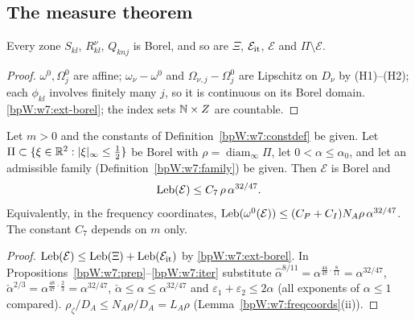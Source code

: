 \subsection{The measure theorem}\label{bpW:w7:main-sec}

\begin{lemma}[Measurability]\label{bpW:w7:measurable}
Every zone $S_{kl}$, $R^\nu_{kl}$, $Q_{knj}$ is Borel, and so are $\Xi$, $\mathcal E_{\rm it}$, $\mathcal E$ and
$\Pi\setminus\mathcal E$.
\end{lemma}
\begin{proof}
\label{stepW:w7:meas-cont}
$\omega^0,\Omega^0_j$ are affine; $\omega_\nu-\omega^0$ and $\Omega_{\nu,j}-\Omega^0_j$ are Lipschitz on $D_\nu$ by
(H1)--(H2); each $\phi_{kl}$ involves finitely many $j$, so it is continuous on its Borel domain.
\label{stepW:w7:meas-union}
\ref{bpW:w7:ext-borel}; the index sets $\mathbb{N}\times Z$ are countable.
\end{proof}

\begin{theorem}\label{bpW:w7:measure}
Let $m>0$ and the constants of Definition~\ref{bpW:w7:constdef} be given. Let $\Pi\subset\{\xi\in\mathbb{R}^2:
\lvert \xi\rvert_\infty\le\frac12\}$ be Borel with $\rho=\operatorname{diam}_\infty\Pi$, let $0<\alpha\le\alpha_0$, and let an
admissible family (Definition~\ref{bpW:w7:family}) be given. Then $\mathcal E$ is Borel and
\[\operatorname{Leb}(\mathcal E)\le C_7\,\rho\,\alpha^{32/47}.\]
Equivalently, in the frequency coordinates, $\operatorname{Leb}(\omega^0(\mathcal E))\le(C_P+C_I)N_A\rho\,\alpha^{32/47}$. The
constant $C_7$ depends on $m$ only.
\end{theorem}
\begin{proof}
\label{stepW:w7:assemble}
$\operatorname{Leb}(\mathcal E)\le\operatorname{Leb}(\Xi)+\operatorname{Leb}(\mathcal E_{\rm it})$ by \ref{bpW:w7:ext-borel}. In
Propositions~\ref{bpW:w7:prep}--\ref{bpW:w7:iter} substitute $\hat\alpha^{8/11}=\alpha^{\frac{44}{47}\cdot\frac8{11}}
=\alpha^{32/47}$, $\check\alpha^{2/3}=\alpha^{\frac{48}{47}\cdot\frac23}=\alpha^{32/47}$, $\check\alpha\le\alpha
\le\alpha^{32/47}$ and $\varepsilon_1+\varepsilon_2\le2\alpha$ (all exponents of $\alpha\le1$ compared).
\label{stepW:w7:return}
$\rho_\zeta/D_A\le N_A\rho/D_A=L_A\rho$ (Lemma~\ref{bpW:w7:freqcoords}(ii)).
\end{proof}

